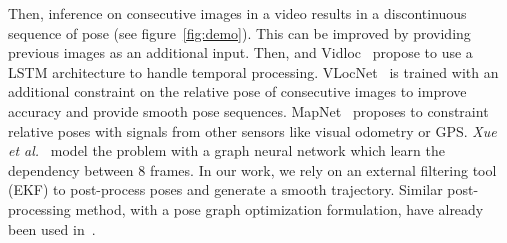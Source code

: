 \documentclass[10pt,twocolumn,letterpaper]{article}
\begin{document}
Then, inference on consecutive images in a video results in a discontinuous sequence of pose (see figure~\ref{fig:demo}). This can be improved by providing previous images as an additional input. Then, \cite{lstmpose} and Vidloc~\cite{vidloc} propose to use a LSTM architecture to handle temporal processing. VLocNet~\cite{VLocNet} is trained with an additional constraint on the relative pose of consecutive images to improve accuracy and provide smooth pose sequences. MapNet~\cite{mapnet2018} proposes to constraint relative poses with signals from other sensors like visual odometry or GPS. \textit{Xue et al.}~\cite{graph_neural_network} model the problem with a graph neural network which learn the dependency between 8 frames. In our work, we rely on an external filtering tool (EKF) to post-process poses and generate a smooth trajectory. Similar post-processing method, with a pose graph optimization formulation, have already been used in~\cite{mapnet2018,RVL}.
\end{document}
